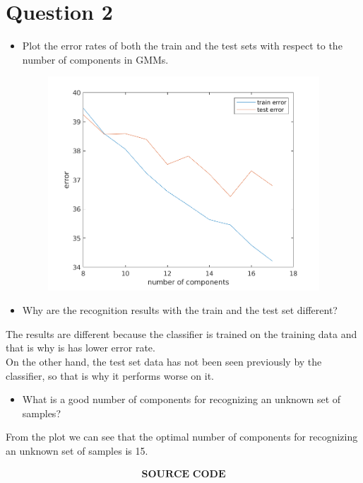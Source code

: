 \documentclass[17pt]{article}
\begin{document}
\section{Question 2}
\begin{itemize}
	\item{Plot the error rates of both the train and the test sets with respect to the number of components in GMMs.}	
\end{itemize}


\begin{center}
\includegraphics[width=15cm, height=8cm]{error.png}
\end{center}

\begin{itemize}
	\item{Why are the recognition results with the train and the test set different?}
\end{itemize}
The results are different because the classifier is trained on the training data and that is why is has lower error rate. \\
On the other hand, the test set data has not been seen previously by the
classifier, so that is why it performs worse on it.

\begin{itemize}
	\item{What is a good number of components for recognizing an unknown set of samples?}
\end{itemize}
From the plot we can see that the optimal number of components for
recognizing an unknown set of samples is 15.

\newpage
\begin{align}
\textbf{SOURCE CODE}
\end{align}
\end{document}
